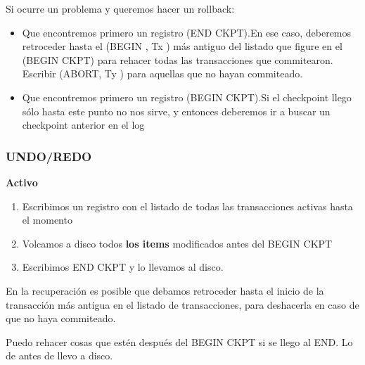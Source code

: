 Si ocurre un problema y queremos hacer un rollback:
\begin{itemize}
\item Que encontremos primero un registro (END CKPT).En ese caso,
deberemos retroceder hasta el (BEGIN , Tx ) más antiguo del
listado que figure en el (BEGIN CKPT) para rehacer todas las
transacciones que commitearon. Escribir (ABORT, Ty ) para
aquellas que no hayan commiteado.

\item Que encontremos primero un registro (BEGIN CKPT).Si el
checkpoint llego sólo hasta este punto no nos sirve, y entonces
deberemos ir a buscar un checkpoint anterior en el log
\end{itemize}


\subsubsection*{UNDO/REDO}

\textbf{Activo}

\begin{enumerate}
\item Escribimos un registro con el listado de todas las transacciones activas hasta el momento
\item Volcamos a disco todos \textbf{los items} modificados antes del BEGIN CKPT
\item Escribimos END CKPT y lo llevamos al disco.
\end{enumerate}

En la recuperación es posible que debamos retroceder hasta el
inicio de la transacción más antigua en el listado de
transacciones, para deshacerla en caso de que no haya
commiteado.

Puedo rehacer cosas que estén después del BEGIN CKPT si se llego al END. Lo de antes de llevo a disco. 




\newpage